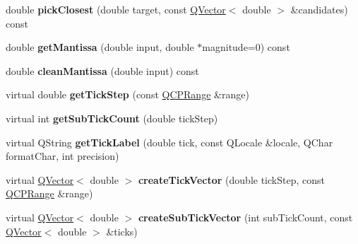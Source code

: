 \begin{DoxyCompactItemize}
\item 
double {\bfseries pick\+Closest} (double target, const \hyperlink{class_q_vector}{Q\+Vector}$<$ double $>$ \&candidates) const \hypertarget{class_q_c_p_axis_ticker_ae967cfb82e329d834a50c6f1f0d2a33d}{}\label{class_q_c_p_axis_ticker_ae967cfb82e329d834a50c6f1f0d2a33d}

\item 
double {\bfseries get\+Mantissa} (double input, double $\ast$magnitude=0) const \hypertarget{class_q_c_p_axis_ticker_a791ecd8c1a9c000f8e7fdb2578aca257}{}\label{class_q_c_p_axis_ticker_a791ecd8c1a9c000f8e7fdb2578aca257}

\item 
double {\bfseries clean\+Mantissa} (double input) const \hypertarget{class_q_c_p_axis_ticker_a534f5a2c9f8565c602a5423e944c7747}{}\label{class_q_c_p_axis_ticker_a534f5a2c9f8565c602a5423e944c7747}

\item 
virtual double {\bfseries get\+Tick\+Step} (const \hyperlink{class_q_c_p_range}{Q\+C\+P\+Range} \&range)\hypertarget{class_q_c_p_axis_ticker_a4ff8a8bff34993820d3b75b6cdc4a85d}{}\label{class_q_c_p_axis_ticker_a4ff8a8bff34993820d3b75b6cdc4a85d}

\item 
virtual int {\bfseries get\+Sub\+Tick\+Count} (double tick\+Step)\hypertarget{class_q_c_p_axis_ticker_aa3703390b2b7a54b8cf0a81d58f75624}{}\label{class_q_c_p_axis_ticker_aa3703390b2b7a54b8cf0a81d58f75624}

\item 
virtual Q\+String {\bfseries get\+Tick\+Label} (double tick, const Q\+Locale \&locale, Q\+Char format\+Char, int precision)\hypertarget{class_q_c_p_axis_ticker_ad51fe3f25144d24d84694fb21a2a1222}{}\label{class_q_c_p_axis_ticker_ad51fe3f25144d24d84694fb21a2a1222}

\item 
virtual \hyperlink{class_q_vector}{Q\+Vector}$<$ double $>$ {\bfseries create\+Tick\+Vector} (double tick\+Step, const \hyperlink{class_q_c_p_range}{Q\+C\+P\+Range} \&range)\hypertarget{class_q_c_p_axis_ticker_a861191fe54b81d4d1d6ff21af05af65c}{}\label{class_q_c_p_axis_ticker_a861191fe54b81d4d1d6ff21af05af65c}

\item 
virtual \hyperlink{class_q_vector}{Q\+Vector}$<$ double $>$ {\bfseries create\+Sub\+Tick\+Vector} (int sub\+Tick\+Count, const \hyperlink{class_q_vector}{Q\+Vector}$<$ double $>$ \&ticks)\hypertarget{class_q_c_p_axis_ticker_a08dddea0b6a833dcbd9e0b4366814640}{}\label{class_q_c_p_axis_ticker_a08dddea0b6a833dcbd9e0b4366814640}


\end{DoxyCompactItemize}
